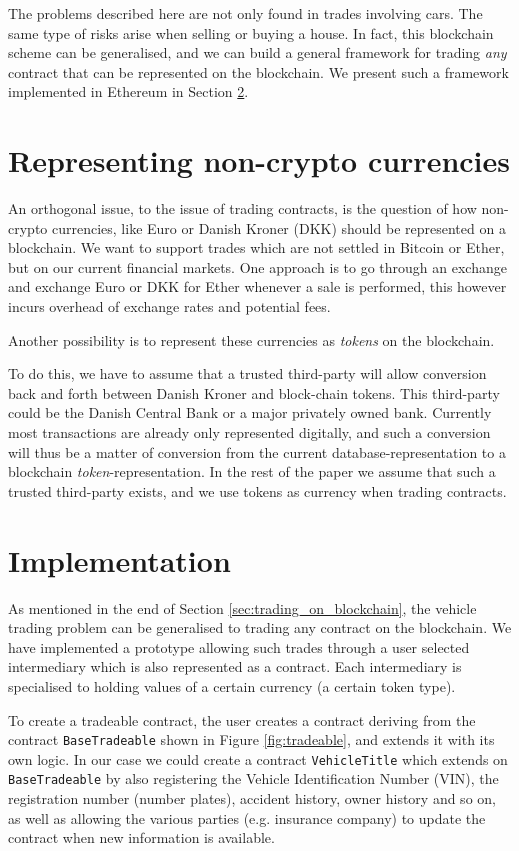 \documentclass[oneside,a4paper,10pts,article]{memoir}
\begin{document}
The problems described here are not only found in trades involving
cars. The same type of risks arise when selling or buying a house. In
fact, this blockchain scheme can be generalised, and we can build a
general framework for trading \textit{any} contract that can be
represented on the blockchain. We present such a framework implemented
in Ethereum in Section \ref{sec:implementation}.

\chapter{Representing non-crypto currencies}
\label{sec:currency}
An orthogonal issue, to the issue of trading contracts, is the
question of how non-crypto currencies, like Euro or Danish Kroner
(DKK) should be represented on a blockchain. We want to support trades
which are not settled in Bitcoin or Ether, but on our current
financial markets. One approach is to go through an exchange and
exchange Euro or DKK for Ether whenever a sale is performed, this
however incurs overhead of exchange rates and potential fees.

Another possibility is to represent these currencies as
\textit{tokens} on the blockchain. 

To do this, we have to assume that a trusted third-party will allow
conversion back and forth between Danish Kroner and block-chain
tokens. This third-party could be the Danish Central Bank or a major
privately owned bank. Currently most transactions are already only
represented digitally, and such a conversion will thus be a matter of
conversion from the current database-representation to a blockchain
\emph{token}-representation. In the rest of the paper we assume that
such a trusted third-party exists, and we use tokens as currency when
trading contracts.

\chapter{Implementation}
\label{sec:implementation}
As mentioned in the end of Section \ref{sec:trading_on_blockchain},
the vehicle trading problem can be generalised to trading any contract
on the blockchain. We have implemented a prototype allowing such
trades through a user selected intermediary which is also represented
as a contract. Each intermediary is specialised to holding values of a
certain currency (a certain token type).

To create a tradeable contract, the user creates a contract deriving
from the contract \texttt{BaseTradeable} shown in Figure
\ref{fig:tradeable}, and extends it with its own logic. In our case we
could create a contract \texttt{VehicleTitle} which extends on
\texttt{BaseTradeable} by also registering the Vehicle Identification
Number (VIN), the registration number (number plates), accident
history, owner history and so on, as well as allowing the various
parties (e.g. insurance company) to update the contract when new
information is available.
\end{document}
